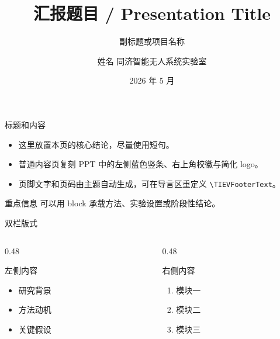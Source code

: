 \documentclass[UTF8,fontset=fandol]{ctexbeamer}
\title{汇报题目 / Presentation Title}
\subtitle{副标题或项目名称}
\author[姓名]{姓名 同济智能无人系统实验室}
\date{2026 年 5 月}
\begin{document}
\maketitle

\begin{frame}[t,fragile]{标题和内容}
  \begin{itemize}
    \item 这里放置本页的核心结论，尽量使用短句\cite{latexcompanion}。
    \item 普通内容页复刻 PPT 中的左侧蓝色竖条、右上角校徽与简化 logo。
    \item 页脚文字和页码由主题自动生成，可在导言区重定义 \verb|\TIEVFooterText|。
  \end{itemize}

  \vspace{0.35cm}
  \begin{block}{重点信息}
    可以用 block 承载方法、实验设置或阶段性结论。
  \end{block}
\end{frame}

\begin{frame}[t]{双栏版式}
  \begin{columns}[T,onlytextwidth]
    \begin{column}{0.48\textwidth}
      \begin{block}{左侧内容}
        \begin{itemize}
          \item 研究背景
          \item 方法动机
          \item 关键假设
        \end{itemize}
      \end{block}
    \end{column}
    \begin{column}{0.48\textwidth}
      \begin{block}{右侧内容}
        \begin{enumerate}
          \item 模块一
          \item 模块二
          \item 模块三
        \end{enumerate}
      \end{block}
    \end{column}
  \end{columns}
\end{frame}
\end{document}
